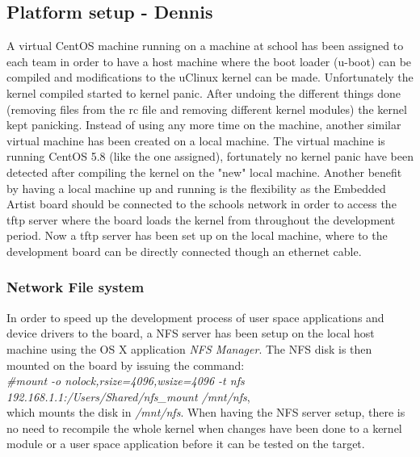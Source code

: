 \subsection{Platform setup - Dennis} 
A virtual CentOS machine running on a machine at school has been assigned to each team in order to have a host machine where the boot loader (u-boot) can be compiled and modifications to the uClinux kernel can be made. Unfortunately the kernel compiled started to kernel panic. After undoing the different things done (removing files from the rc file and removing different kernel modules) the kernel kept panicking. Instead of using any more time on the machine, another similar virtual machine has been created on a local machine. The virtual machine is running CentOS 5.8 (like the one assigned), fortunately no kernel panic have been detected after compiling the kernel on the "new" local machine. Another benefit by having a local machine up and running is the flexibility as the Embedded Artist board should be connected to the schools network in order to access the tftp server where the board loads the kernel from throughout the development period. Now a tftp server has been set up on the local machine, where to the development board can be directly connected though an ethernet cable.
\subsubsection{Network File system}
In order to speed up the development process of user space applications and device drivers to the board, a NFS server has been setup on the local host machine using the OS X application \textit{NFS Manager}. The NFS disk is then mounted on the board by issuing the command: \\\textit{\#mount -o nolock,rsize=4096,wsize=4096 -t nfs 192.168.1.1:/Users/Shared/nfs\_mount /mnt/nfs}, 
\\which mounts the disk in \textit{/mnt/nfs}. When having the NFS server setup, there is no need to recompile the whole kernel when changes have been done to a kernel module or a user space application before it can be tested on the target. 

